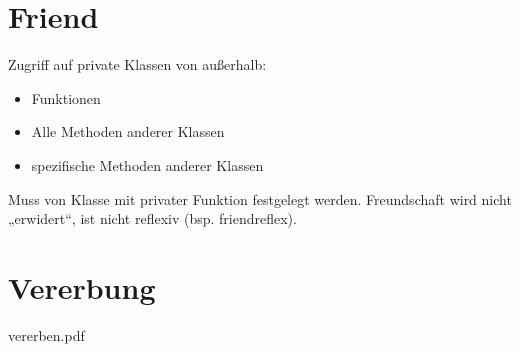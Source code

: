 \section{Friend}
Zugriff auf private Klassen von außerhalb:
\begin{itemize}
\item Funktionen
\item Alle Methoden anderer Klassen
\item spezifische Methoden anderer Klassen
\end{itemize}
Muss von Klasse mit privater Funktion festgelegt werden. Freundschaft wird nicht „erwidert“, ist nicht reflexiv (bsp. friendreflex).

\section{Vererbung}
vererben.pdf


